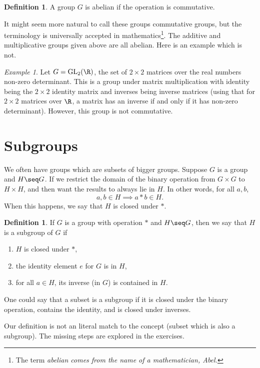 \documentclass[12pt]{amsart}
\newcommand{\terminology}[1]{\textbf{\textit{#1}}}
\renewcommand{\terminology}[1]{#1}
\newcommand{\term}{\terminology}
\DeclareMathOperator{\GL}{GL}
\theoremstyle{plain}
\theoremstyle{definition}
\newtheorem{defn}[thm]{Definition}
\theoremstyle{remark}
\newtheorem*{exam}{Example}
\begin{document}
\begin{defn}
  A group $G$ is \term{abelian} if the operation is commutative.
\end{defn}
It might seem more natural to call these groups commutative groups,
but the terminology is universally accepted in
mathematics\footnote{The term \em{abelian} comes from the name of a
  mathematician, Abel.}.  The additive and multiplicative groups given
above are all abelian.  Here is an example which is not.
\begin{exam}
  Let $G=\GL_2(\R)$, the set of $2\times 2$ matrices over the real
  numbers non-zero determinant.  This is a group under matrix
  multiplication with identity being the $2\times 2$ identity matrix
  and inverses being inverse matrices (using that for $2\times 2$
  matrices over $\R$, a matrix has an inverse if and only if it
  has non-zero determinant).  However, this group
  is not commutative.
\end{exam}

\section{Subgroups}

We often have groups which are subsets of bigger groups.  Suppose $G$
is a group and $H\seq G$.
If we restrict the domain of the binary operation from
$G\times G$ to $H\times H$, and then want the results to always lie in
$H$.  In other words, for all $a,b$,
\[ a,b\in H \implies a*b\in H.\]
When this happens, we say that $H$ is \term{closed under} $*$.

\begin{defn}
  If $G$ is a group with operation $*$ and $H\seq G$, then we say that
  $H$ is a \term{subgroup} of $G$ if
  \begin{enumerate}
  \item $H$ is closed under $*$,
  \item the identity element $e$ for $G$ is in $H$,
  \item for all $a\in H$, its inverse (in $G$) is contained in $H$.
  \end{enumerate}
\end{defn}

One could say that a subset is a subgroup if it is closed under the
binary operation, contains the identity, and is closed under
inverses.

Our definition is not an literal match to the concept (subset which is
also a subgroup).  The missing steps are explored in the exercises.
\end{document}
